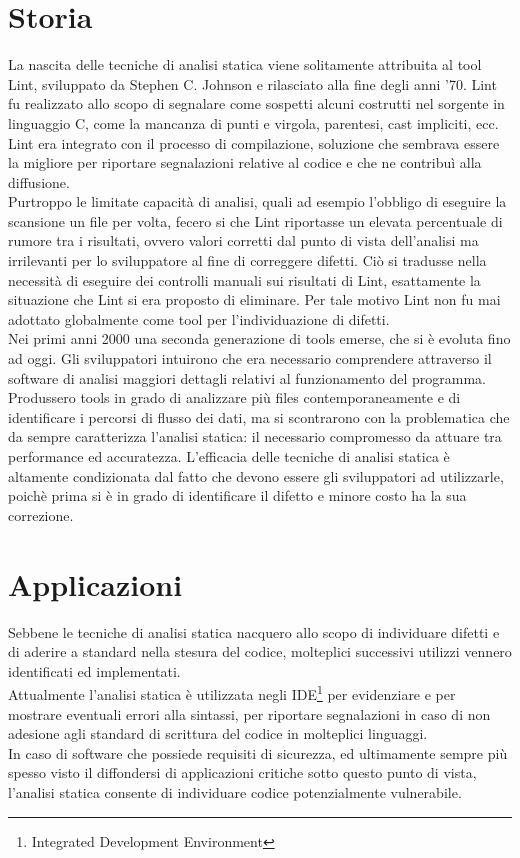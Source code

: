 \section{Storia}
La nascita delle tecniche di analisi statica viene solitamente attribuita al tool Lint, sviluppato da Stephen C. Johnson e rilasciato alla fine degli anni '70. Lint fu realizzato allo scopo di segnalare come sospetti alcuni costrutti nel sorgente in linguaggio C, come la mancanza di punti e virgola, parentesi, cast impliciti, ecc. 
Lint era integrato con il processo di compilazione, soluzione che sembrava essere la migliore per riportare segnalazioni relative al codice e che ne contribuì alla diffusione.\\
Purtroppo le limitate capacità di analisi, quali ad esempio l'obbligo di eseguire la scansione un file per volta, fecero si che Lint riportasse un elevata percentuale di rumore tra i risultati, ovvero valori corretti dal punto di vista dell'analisi ma irrilevanti per lo sviluppatore al fine di correggere difetti. Ciò si tradusse nella necessità di eseguire dei controlli manuali sui risultati di Lint, esattamente la situazione che Lint si era proposto di eliminare.
Per tale motivo Lint non fu mai adottato globalmente come tool per l'individuazione di difetti.\\
Nei primi anni 2000 una seconda generazione di tools emerse, che si è evoluta fino ad oggi. Gli sviluppatori intuirono che era necessario comprendere attraverso il software di analisi maggiori dettagli relativi al funzionamento del programma. Produssero tools in grado di  analizzare più files contemporaneamente e di identificare i percorsi di flusso dei dati, ma si scontrarono con la problematica che da sempre caratterizza l'analisi statica: il necessario compromesso da attuare tra performance ed accuratezza. L'efficacia delle tecniche di analisi statica è altamente condizionata dal fatto che devono essere gli sviluppatori ad utilizzarle, poichè prima si è in grado di identificare il difetto e minore costo ha la sua correzione.

\section{Applicazioni}
Sebbene le tecniche di analisi statica nacquero allo scopo di individuare difetti e di aderire a standard nella stesura del codice, molteplici successivi utilizzi vennero identificati ed implementati. \\
Attualmente l'analisi statica è utilizzata negli IDE\footnote{Integrated Development Environment} per evidenziare e per mostrare eventuali errori alla sintassi, per riportare segnalazioni in caso di non adesione agli standard di scrittura del codice in molteplici linguaggi.\\
In caso di software che possiede requisiti di sicurezza, ed ultimamente sempre più spesso visto il diffondersi di applicazioni critiche sotto questo punto di vista, l'analisi statica consente di individuare codice potenzialmente vulnerabile.

